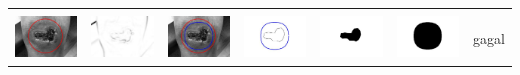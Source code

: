 \begin{table}[H]
\begin{tabular}{|m{0.7in}|m{0.7in}|m{0.7in}|m{0.7in}|m{0.7in}|m{0.7in}|m{0.7in}|}
		&  &  & & & &  \\
		\includegraphics[width=0.7in]{dataset/dataset_3/luka_merah/ready/17_integer_init.jpg}&
		\includegraphics[width=0.7in]{dataset/dataset_3/luka_merah/ready/17_integer_ext.jpg}&
		\includegraphics[width=0.7in]{dataset/dataset_3/luka_merah/ready/17_integer_result.jpg}&
		\includegraphics[width=0.7in]{dataset/dataset_3/luka_merah/ready/17_gt_r_integer.jpg}&
		\includegraphics[width=0.7in]{dataset/dataset_3/luka_merah/ready/17_r.jpg}&
		\includegraphics[width=0.7in]{dataset/dataset_3/luka_merah/ready/17_integer_r.jpg}&
		gagal\\
		\hline
		
	\end{tabular}
\end{table}


